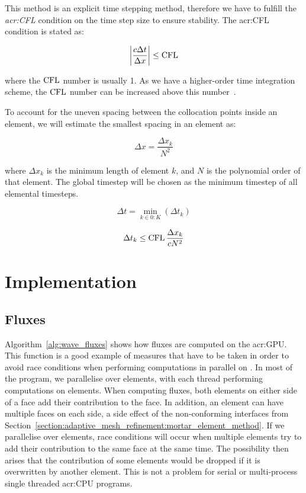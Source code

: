 This method is an explicit time stepping method, therefore we have to fulfill the
\textit{\acrfull{acr:CFL}} condition on the time step size to ensure stability. The
\acrshort{acr:CFL} condition is stated as:

\begin{equation}
    \left| \frac{c \Delta t}{\Delta x} \right| \leq \operatorname{CFL}
\end{equation}

\noindent
where the \(\operatorname{CFL} \) number is usually 1. As we have a higher-order time integration scheme, the
\(\operatorname{CFL} \) number can be increased above this number~\cite{Gottlieb2001}.

To account for the uneven spacing between the collocation points inside an element, we will estimate
the smallest spacing in an element as: 

\begin{equation}
    \Delta x = \frac{\Delta x_k}{N^2}
\end{equation}

\noindent
where \(\Delta x_k\) is the minimum length of element \(k\), and \(N\) is the polynomial
order of that element. The global timestep will be chosen as the minimum timestep of all elemental
timesteps. 

\begin{equation}
    \Delta t = \min_{k \in 0:K} \left( \Delta t_k \right)
\end{equation}

\begin{equation}
    \Delta t_k \leq \operatorname{CFL} \frac{\Delta x_k}{cN^2}
\end{equation}

\section{Implementation}\label{section:spectral_element_method:implementation}

\subsection{Fluxes}\label{subsection:spectral_element_method:implementation:fluxes}

Algorithm~\ref{alg:wave_fluxes} shows how fluxes are computed on the \acrshort{acr:GPU}. This
function is a good example of measures that have to be taken in order to avoid race conditions when
performing computations in parallel on . In most of the program, we parallelise
over elements, with each thread performing computations on elements. When computing fluxes, both
elements on either side of a face add their contribution to the face. In addition, an element can
have multiple faces on each side, a side effect of the non-conforming interfaces from
Section~\ref{section:adaptive_mesh_refinement:mortar_element_method}. If we parallelise over
elements, race conditions will occur when multiple elements try to add their contribution to the
same face at the same time. The possibility then arises that the contribution of some elements would
be dropped if it is overwritten by another element. This is not a problem for serial or
multi-process single threaded \acrshort{acr:CPU} programs.

